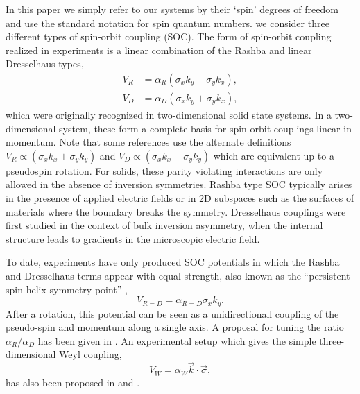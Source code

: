 \documentclass[%
 preprint,
 amsmath,amssymb,
 aps,
]{revtex4-1}
\begin{document}
In this paper we simply refer to our systems by their `spin' degrees of freedom and use the standard notation for spin quantum numbers. we consider three different types of spin-orbit coupling (SOC). The form of spin-orbit coupling realized in experiments is a linear combination of the Rashba \cite{0022-3719-17-33-015} and linear Dresselhaus \cite{PhysRev.100.580} types,
\begin{align}
V_{R}&=\alpha_R (\sigma_x k_y-\sigma_y k_x) \label{eq:Rashba},\\
V_{D}&=\alpha_D (\sigma_x k_y+\sigma_y k_x) \label{eq:Dresselhaus},
\end{align} 
which were originally recognized in two-dimensional solid state systems. In a two-dimensional system, these form a complete basis for spin-orbit couplings linear in momentum. Note that some references use the alternate definitions $V_R\propto  (\sigma_x k_x+\sigma_y k_y) $ and $V_D\propto  (\sigma_x k_x-\sigma_y k_y) $ which are equivalent up to a pseudospin rotation.  For solids, these parity violating interactions are only allowed in the absence of inversion symmetries. Rashba type SOC typically arises in the presence of applied electric fields or in 2D subspaces such as the surfaces of materials where the boundary breaks the symmetry. Dresselhaus couplings were first studied in the context of bulk inversion asymmetry, when the internal structure leads to gradients in the microscopic electric field. 


To date, experiments have only produced SOC potentials in which the Rashba and Dresselhaus terms appear with equal strength, also known as the ``persistent spin-helix symmetry point'' \cite{PhysRevLett.97.236601}, 
\begin{equation}
\label{eq:R=D}
V_{R=D}=\alpha_{R=D}\sigma_x k_y.
\end{equation} 
After a rotation, this potential can be seen as a unidirectionall coupling of the pseudo-spin and momentum along a single axis. A proposal for tuning the ratio $\alpha_R/\alpha_D$ has been given in \cite{PhysRevA.84.025602}.  An experimental setup which gives the simple three-dimensional Weyl coupling,
\begin{equation}\label{eq:Weyl}
V_{W}=\alpha_W \vec{k}\cdot\vec{\sigma},
\end{equation}
has also been proposed in \cite{PhysRevLett.108.235301} and \cite{PhysRevLett.111.125301}. %
\end{document}
